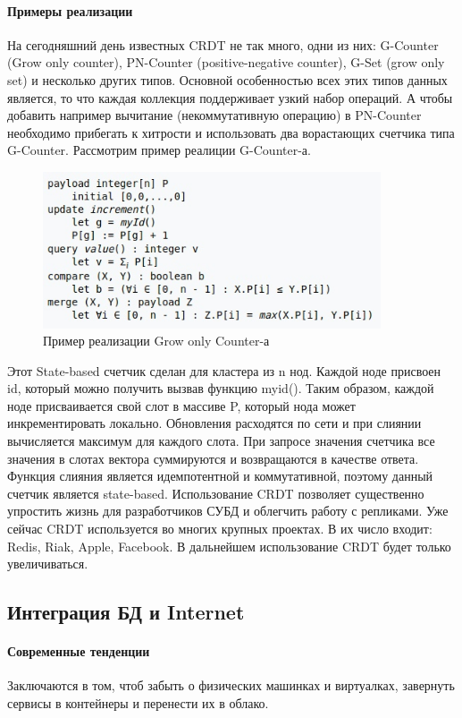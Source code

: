 \paragraph{Примеры реализации}
На сегодняшний день известных CRDT не так много, одни из них: G-Counter (Grow only counter), PN-Counter (positive-negative counter), G-Set (grow only set) и несколько других типов. Основной особенностью всех этих типов данных является, то что каждая коллекция поддерживает узкий набор операций. А чтобы добавить например вычитание (некоммутативную операцию) в PN-Counter необходимо прибегать к хитрости и использовать два ворастающих счетчика типа G-Counter. Рассмотрим пример реалиции G-Counter-а. 
\begin{figure}[H]
    \centering
    \includegraphics[width=100mm]{assets/distributed/G-Counter}
    \caption{Пример реализации Grow only Counter-а}
    \label{fig:G-Counter}
\end{figure}
Этот State-based счетчик сделан для кластера из n нод. Каждой ноде присвоен id, который можно получить вызвав функцию myid(). Таким образом, каждой ноде присваивается свой слот в массиве P, который нода может инкрементировать локально. Обновления расходятся по сети и при слиянии вычисляется максимум для каждого слота. При запросе значения счетчика все значения в слотах вектора суммируются и возвращаются в качестве ответа. Функция слияния является идемпотентной и коммутативной, поэтому данный счетчик является state-based.
Использование CRDT позволяет существенно упростить жизнь для разработчиков СУБД и облегчить работу с репликами. Уже сейчас CRDT используется во многих крупных проектах. В их число входит: Redis, Riak, Apple, Facebook. В дальнейшем использование CRDT будет только увеличиваться. 

\subsection{Интеграция БД и Internet}
\paragraph{Современные тенденции}
Заключаются в том, чтоб забыть о физических машинках и виртуалках, завернуть сервисы в контейнеры и перенести их в облако.

